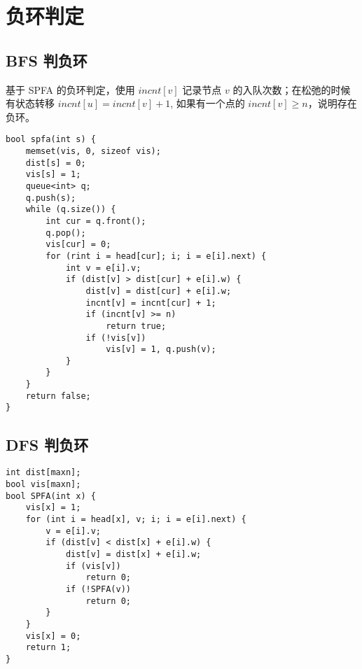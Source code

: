 \section{负环判定}

\subsection{BFS 判负环}
基于 SPFA 的负环判定，使用 $incnt[v]$ 记录节点 $v$ 的入队次数；在松弛的时候有状态转移 $incnt[u] = incnt[v] + 1$, 如果有一个点的 $incnt[v] \ge n$，说明存在负环。

\begin{verbatim}
bool spfa(int s) {
    memset(vis, 0, sizeof vis);
    dist[s] = 0;
    vis[s] = 1;
    queue<int> q;
    q.push(s);
    while (q.size()) {
        int cur = q.front();
        q.pop();
        vis[cur] = 0;
        for (rint i = head[cur]; i; i = e[i].next) {
            int v = e[i].v;
            if (dist[v] > dist[cur] + e[i].w) {
                dist[v] = dist[cur] + e[i].w;
                incnt[v] = incnt[cur] + 1;
                if (incnt[v] >= n)
                    return true;
                if (!vis[v])
                    vis[v] = 1, q.push(v);
            }
        }
    }
    return false;
}
\end{verbatim}

\subsection{DFS 判负环}

\begin{verbatim}
int dist[maxn];
bool vis[maxn];
bool SPFA(int x) {
    vis[x] = 1;
    for (int i = head[x], v; i; i = e[i].next) {
        v = e[i].v;
        if (dist[v] < dist[x] + e[i].w) {
            dist[v] = dist[x] + e[i].w;
            if (vis[v])
                return 0;
            if (!SPFA(v))
                return 0;
        }
    }
    vis[x] = 0;
    return 1;
}
\end{verbatim}
